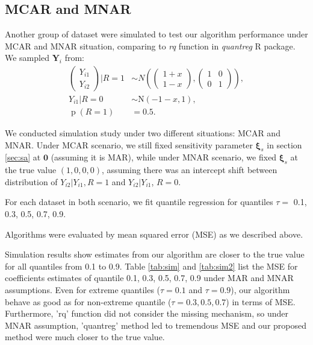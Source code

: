 \documentclass[12pt]{article}
\DeclareMathOperator{\pr}{p}
\begin{document}
\subsection{MCAR and MNAR}

Another group of dataset were simulated to test our algorithm
performance under MCAR and MNAR situation, comparing to \textit{rq}
function in \textit{quantreg} R package. We sampled $\bm Y_i$ from:
\begin{align*}
  \begin{pmatrix}
    Y_{i1}\\
    Y_{i2}
  \end{pmatrix}
  \Big |R = 1 & \sim N \left(
    \begin{pmatrix}
      1 + x\\
      1 - x
    \end{pmatrix},
    \begin{pmatrix}
      1& 0 \\
      0 & 1
    \end{pmatrix} \right), \\
  Y_{i1} | R = 0 & \sim \textrm{N}(-1-x, 1) , \\
  \pr (R = 1) & = 0.5.
\end{align*}

We conducted simulation study under two different situations: MCAR and
MNAR. Under MCAR scenario, we still fixed sensitivity parameter $\bm
\xi_s$ in section \ref{sec:sa} at $\bm 0$ (assuming it is MAR), while
under MNAR scenario, we fixed $\bm \xi_s$ at the true value $(1, 0, 0,
0)$, assuming there was an intercept shift between distribution of
$Y_{i2}|Y_{i1}, R = 1$ and $Y_{i2}|Y_{i1}$, $R = 0$.

For each dataset in both scenario, we fit quantile regression for
quantiles $\tau =$  0.1, 0.3, 0.5, 0.7, 0.9.

Algorithms were evaluated by mean squared error (MSE)
as we described above. 

Simulation results show estimates from our algorithm are closer to the
true value for all quantiles from 0.1 to 0.9. Table \ref{tab:sim} and
\ref{tab:sim2} list the MSE for coefficients estimates of quantile
0.1, 0.3, 0.5, 0.7, 0.9 under MAR and MNAR assumptions. Even for
extreme quantiles ($\tau = 0.1$ and $\tau = 0.9$), our algorithm
behave as good as for non-extreme quantile ($\tau = 0.3, 0.5, 0.7$) in
terms of MSE. Furthermore, 'rq' function did not consider the missing
mechanism, so under MNAR assumption, 'quantreg' method led to
tremendous MSE and our proposed method were much closer to the true
value.
\end{document}

